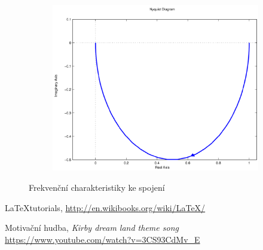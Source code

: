 \documentclass[twoside]{article}
\begin{document}
\begin{figure}[htbp]
\begin{subfigure}{0.25\textwidth}
	\includegraphics[width=\linewidth]{zadani12-f}
  \caption{}
  \label{fig:frekchar:f}
\end{subfigure}
\caption{Frekvenční charakteristiky ke spojení}
\label{fig:frekchar}
\end{figure}




\begin{thebibliography}{9}


	\LaTeX tutorials, \url{http://en.wikibooks.org/wiki/LaTeX/}

	Motivační hudba, \emph{Kirby dream land theme song} \url{https://www.youtube.com/watch?v=3CS93CdMv_E}

\end{thebibliography}
\end{document}
